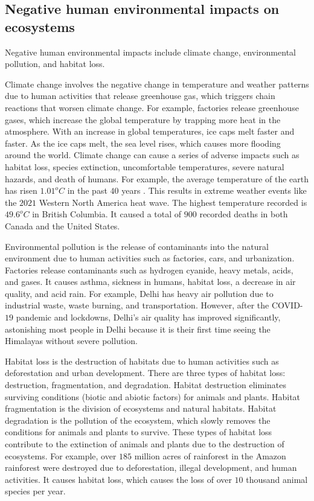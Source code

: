 \documentclass{article}
\begin{document}
\subsection{Negative human environmental impacts on ecosystems}
Negative human environmental impacts include climate change, environmental pollution, and habitat loss. 
 
Climate change involves the negative change in temperature and weather patterns due to human activities that release greenhouse gas, which triggers chain reactions that worsen climate change. For example, factories release greenhouse gases, which increase the global temperature by trapping more heat in the atmosphere. With an increase in global temperatures, ice caps melt faster and faster. As the ice caps melt, the sea level rises, which causes more flooding around the world. Climate change can cause a series of adverse impacts such as habitat loss, species extinction, uncomfortable temperatures, severe natural hazards, and death of humans. For example, the average temperature of the earth has risen $1.01^{o}C$ in the past $40$ years \cite{cite5}. This results in extreme weather events like the $2021$ Western North America heat wave. The highest temperature recorded is $49.6^{o}C$ in British Columbia. It caused a total of $900$ recorded deaths in both Canada and the United States. 
 
Environmental pollution is the release of contaminants into the natural environment due to human activities such as factories, cars, and urbanization. Factories release contaminants such as hydrogen cyanide, heavy metals, acids, and gases. It causes asthma, sickness in humans, habitat loss, a decrease in air quality, and acid rain. For example, Delhi has heavy air pollution due to industrial waste, waste burning, and transportation. However, after the COVID-$19$ pandemic and lockdowns, Delhi’s air quality has improved significantly, astonishing most people in Delhi because it is their first time seeing the Himalayas without severe pollution.  
 
Habitat loss is the destruction of habitats due to human activities such as deforestation and urban development. There are three types of habitat loss: destruction, fragmentation, and degradation. Habitat destruction eliminates surviving conditions (biotic and abiotic factors) for animals and plants. Habitat fragmentation is the division of ecosystems and natural habitats. Habitat degradation is the pollution of the ecosystem, which slowly removes the conditions for animals and plants to survive. These types of habitat loss contribute to the extinction of animals and plants due to the destruction of ecosystems. For example, over $185$ million acres of rainforest in the Amazon rainforest were destroyed due to deforestation, illegal development, and human activities. It causes habitat loss, which causes the loss of over $10$ thousand animal species per year\cite{cite6}. 
 
\end{document}
